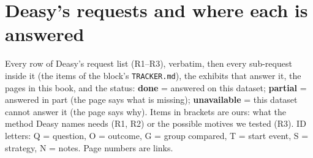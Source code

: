 \section*{Deasy's requests and where each is answered}
{\small Every row of Deasy's request list (R1--R3), verbatim, then every sub-request inside it (the items of the block's \texttt{TRACKER.md}), the exhibits that answer it, the pages in this book, and the status: \textbf{done} = answered on this dataset; \textbf{partial} = answered in part (the page says what is missing); \textbf{unavailable} = this dataset cannot answer it (the page says why). Items in brackets are ours: what the method Deasy names needs (R1, R2) or the possible motives we tested (R3). ID letters: Q = question, O = outcome, G = group compared, T = start event, S = strategy, N = notes. Page numbers are links.}\par\medskip
\footnotesize
